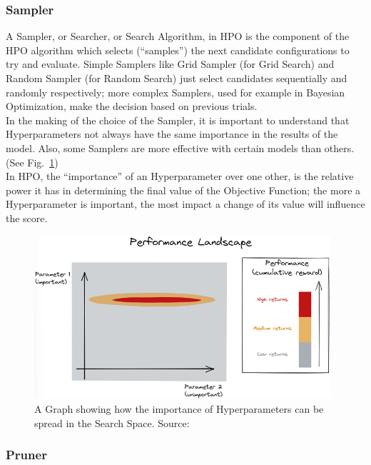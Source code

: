\subsubsection{Sampler}

A Sampler, or Searcher, or Search Algorithm, in HPO is the component of the HPO algorithm which selects (“samples”) the next candidate configurations to try and evaluate.
Simple Samplers like Grid Sampler (for Grid Search) and Random Sampler (for Random Search) just select candidates sequentially and randomly respectively; more complex Samplers, used for example in Bayesian Optimization, make the decision based on previous trials.
\\[0.3cm]In the making of the choice of the Sampler, it is important to understand that Hyperparameters not always have the same importance in the results of the model. Also, some Samplers are more effective with certain models than others. (See Fig.~\ref{fig:figure-2.1.1})
\\[0.3cm]In HPO, the “importance” of an Hyperparameter over one other, is the relative power it has in determining the final value of the Objective Function; the more a Hyperparameter is important, the most impact a change of its value will influence the score.
\begin{figure}[t]
	\centering
	\includegraphics[width=11cm]{figures/figure-2.1.1.png}
	\caption[Hyperparameters Importance]{A Graph showing how the importance of Hyperparameters can be spread in the Search Space. Source:~\cite{Tesi-1.3}}
	\label{fig:figure-2.1.1}
\end{figure}

\subsubsection{Pruner}

